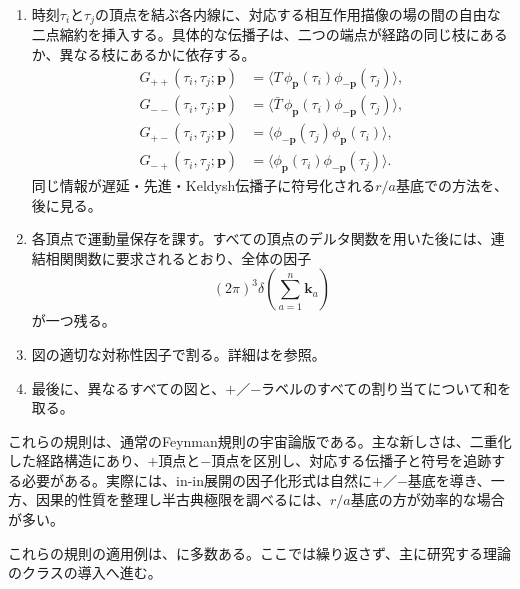 \documentclass[a4paper,11pt,oneside]{article}
\theoremstyle{definition}
\numberwithin{equation}{section}
\begin{document}
\begin{enumerate}
\item
時刻\(\tau_i\)と\(\tau_j\)の頂点を結ぶ各内線に、対応する相互作用描像の場の間の自由な二点縮約を挿入する。具体的な伝播子は、二つの端点が経路の同じ枝にあるか、異なる枝にあるかに依存する。
\begin{align}
G_{++}(\tau_i,\tau_j;\mathbf p) &= \langle T\,\phi_{\mathbf p}(\tau_i)\phi_{-\mathbf p}(\tau_j)\rangle,\\
G_{--}(\tau_i,\tau_j;\mathbf p) &= \langle \bar T\,\phi_{\mathbf p}(\tau_i)\phi_{-\mathbf p}(\tau_j)\rangle,\\
G_{+-}(\tau_i,\tau_j;\mathbf p) &= \langle \phi_{-\mathbf p}(\tau_j)\phi_{\mathbf p}(\tau_i)\rangle,\\
G_{-+}(\tau_i,\tau_j;\mathbf p) &= \langle \phi_{\mathbf p}(\tau_i)\phi_{-\mathbf p}(\tau_j)\rangle .
\end{align}
同じ情報が遅延・先進・Keldysh伝播子に符号化される\(r/a\)基底での方法を、後に見る。



\item
各頂点で運動量保存を課す。すべての頂点のデルタ関数を用いた後には、連結相関関数に要求されるとおり、全体の因子
\begin{equation}
(2\pi)^3\delta\!\left(\sum_{a=1}^n \mathbf k_a\right)
\end{equation}
が一つ残る。



\item
図の適切な対称性因子で割る。詳細は\cite{Goodhew:2023bcu,PajerFieldTheoryCosmologyNotes}を参照。



\item
最後に、異なるすべての図と、\(+\)／\(-\)ラベルのすべての割り当てについて和を取る。
\end{enumerate}



これらの規則は、通常のFeynman規則の宇宙論版である。主な新しさは、二重化した経路構造にあり、\(+\)頂点と\(-\)頂点を区別し、対応する伝播子と符号を追跡する必要がある。実際には、in-in展開の因子化形式は自然に\(+\)／\(-\)基底を導き、一方、因果的性質を整理し半古典極限を調べるには、\(r/a\)基底の方が効率的な場合が多い。



これらの規則の適用例は、\cite{PajerFieldTheoryCosmologyNotes}に多数ある。ここでは繰り返さず、主に研究する理論のクラスの導入へ進む。
\end{document}
